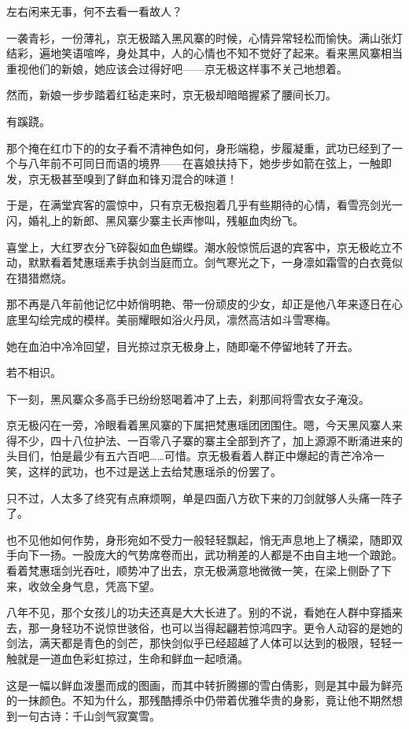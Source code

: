左右闲来无事，何不去看一看故人？

一袭青衫，一份薄礼，京无极踏入黑风寨的时候，心情异常轻松而愉快。满山张灯结彩，遍地笑语喧哗，身处其中，人的心情也不知不觉好了起来。看来黑风寨相当重视他们的新娘，她应该会过得好吧——京无极这样事不关己地想着。

然而，新娘一步步踏着红毡走来时，京无极却暗暗握紧了腰间长刀。

有蹊跷。

那个掩在红巾下的的女子看不清神色如何，身形端稳，步履凝重，武功已经到了一个与八年前不可同日而语的境界——在喜娘扶持下，她步步如箭在弦上，一触即发，京无极甚至嗅到了鲜血和锋刃混合的味道！

于是，在满堂宾客的震惊中，只有京无极抱着几乎有些期待的心情，看雪亮剑光一闪，婚礼上的新郎、黑风寨少寨主长声惨叫，残躯血肉纷飞。

喜堂上，大红罗衣分飞碎裂如血色蝴蝶。潮水般惊慌后退的宾客中，京无极屹立不动，默默看着梵惠瑶素手执剑当庭而立。剑气寒光之下，一身凛如霜雪的白衣竟似在猎猎燃烧。

那不再是八年前他记忆中娇俏明艳、带一份顽皮的少女，却正是他八年来逐日在心底里勾绘完成的模样。美丽耀眼如浴火丹凤，凛然高洁如斗雪寒梅。

她在血泊中冷冷回望，目光掠过京无极身上，随即毫不停留地转了开去。

若不相识。

下一刻，黑风寨众多高手已纷纷怒喝着冲了上去，刹那间将雪衣女子淹没。

京无极闪在一旁，冷眼看着黑风寨的下属把梵惠瑶团团围住。嗯，今天黑风寨人来得不少，四十八位护法、一百零八子寨的寨主全部到齐了，加上源源不断涌进来的头目们，怕是最少有五六百吧……可惜。京无极看着人群正中爆起的青芒冷冷一笑，这样的武功，也不过是送上去给梵惠瑶杀的份罢了。

只不过，人太多了终究有点麻烦啊，单是四面八方砍下来的刀剑就够人头痛一阵子了。

也不见他如何作势，身形宛如不受力一般轻轻飘起，悄无声息地上了横梁，随即双手向下一扬。一股庞大的气势席卷而出，武功稍差的人都是不由自主地一个踉跄。看着梵惠瑶剑光吞吐，顺势冲了出去，京无极满意地微微一笑，在梁上侧卧了下来，收敛全身气息，凭高下望。

八年不见，那个女孩儿的功夫还真是大大长进了。别的不说，看她在人群中穿插来去，那一身轻功不说惊世骇俗，也可以当得起翩若惊鸿四字。更令人动容的是她的剑法，满天都是青色的剑芒，那快剑似乎已经超越了人体可以达到的极限，轻轻一触就是一道血色彩虹掠过，生命和鲜血一起喷涌。

这是一幅以鲜血泼墨而成的图画，而其中转折腾挪的雪白倩影，则是其中最为鲜亮的一抹颜色。不知为什么，那残酷搏杀中仍带着优雅华贵的身影，竟让他不期然想到一句古诗：千山剑气寂寞雪。

